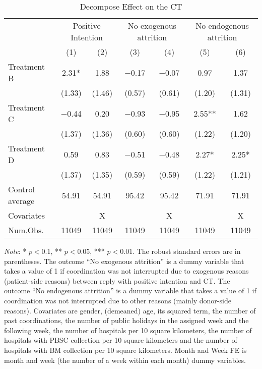 \documentclass[12pt, a4paper]{article}
\begin{document}
\begin{table}[H]

\caption{\label{tab:test-decompose}Decompose Effect on the CT}
\centering
\fontsize{8}{10}\selectfont
\begin{threeparttable}
\begin{tabular}[t]{lcccccc}
\toprule
\multicolumn{1}{c}{ } & \multicolumn{2}{c}{Positive Intention} & \multicolumn{2}{c}{No exogenous attrition} & \multicolumn{2}{c}{No endogenous attrition} \\
\cmidrule(l{3pt}r{3pt}){2-3} \cmidrule(l{3pt}r{3pt}){4-5} \cmidrule(l{3pt}r{3pt}){6-7}
  & (1) & (2) & (3) & (4) & (5) & (6)\\
\midrule
Treatment B & \num{2.31}* & \num{1.88} & \num{-0.17} & \num{-0.07} & \num{0.97} & \num{1.37}\\
 & (\num{1.33}) & (\num{1.46}) & (\num{0.57}) & (\num{0.61}) & (\num{1.20}) & (\num{1.31})\\
Treatment C & \num{-0.44} & \num{0.20} & \num{-0.93} & \num{-0.95} & \num{2.55}** & \num{1.62}\\
 & (\num{1.37}) & (\num{1.36}) & (\num{0.60}) & (\num{0.60}) & (\num{1.22}) & (\num{1.20})\\
Treatment D & \num{0.59} & \num{0.83} & \num{-0.51} & \num{-0.48} & \num{2.27}* & \num{2.25}*\\
 & (\num{1.37}) & (\num{1.35}) & (\num{0.59}) & (\num{0.59}) & (\num{1.22}) & (\num{1.21})\\
\midrule
Control average & 54.91 & 54.91 & 95.42 & 95.42 & 71.91 & 71.91\\
Covariates &  & X &  & X &  & X\\
Num.Obs. & \num{11049} & \num{11049} & \num{11049} & \num{11049} & \num{11049} & \num{11049}\\
\bottomrule
\end{tabular}
\begin{tablenotes}
\item \emph{Note}: * $p < 0.1$, ** $p < 0.05$, *** $p < 0.01$. The robust standard errors are in parentheses. The outcome ``No exogenous attrition'' is a dummy variable that takes a value of 1 if coordination was not interrupted due to exogenous reasons (patient-side reasons) between reply with positive intention and CT. The outcome ``No endogenous attrition'' is a dummy variable that takes a value of 1 if coordination was not interrupted due to other reasons (mainly donor-side reasons). Covariates are gender, (demeaned) age, its squared term, the number of past coordinations, the number of public holidays in the assigned week and the following week, the number of hospitals per 10 square kilometers, the number of hospitals with PBSC collection per 10 square kilometers and the number of hospitals with BM collection per 10 square kilometers. Month and Week FE is month and week (the number of a week within each month) dummy variables.
\end{tablenotes}
\end{threeparttable}
\end{table}
\end{document}
